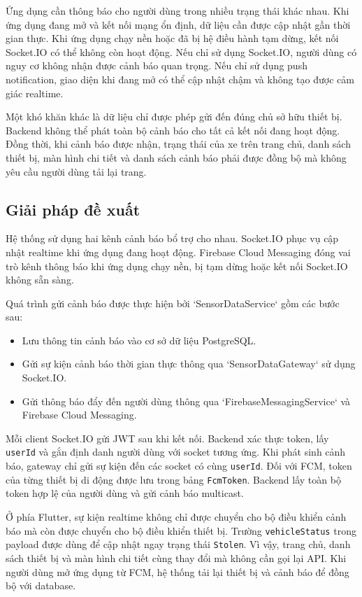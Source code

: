 \documentclass[../DoAn.tex]{subfiles}
\begin{document}
Ứng dụng cần thông báo cho người dùng trong nhiều trạng thái khác nhau. Khi ứng
dụng đang mở và kết nối mạng ổn định, dữ liệu cần được cập nhật gần thời gian
thực. Khi ứng dụng chạy nền hoặc đã bị hệ điều hành tạm dừng, kết nối Socket.IO
có thể không còn hoạt động. Nếu chỉ sử dụng Socket.IO, người dùng có nguy cơ
không nhận được cảnh báo quan trọng. Nếu chỉ sử dụng push notification, giao
diện khi đang mở có thể cập nhật chậm và không tạo được cảm giác realtime.

Một khó khăn khác là dữ liệu chỉ được phép gửi đến đúng chủ sở hữu thiết bị.
Backend không thể phát toàn bộ cảnh báo cho tất cả kết nối đang hoạt động. Đồng
thời, khi cảnh báo được nhận, trạng thái của xe trên trang chủ, danh sách thiết
bị, màn hình chi tiết và danh sách cảnh báo phải được đồng bộ mà không yêu cầu
người dùng tải lại trang.

\subsection{Giải pháp đề xuất}

Hệ thống sử dụng hai kênh cảnh báo bổ trợ cho nhau. Socket.IO phục vụ cập nhật
realtime khi ứng dụng đang hoạt động. Firebase Cloud Messaging đóng vai trò
kênh thông báo khi ứng dụng chạy nền, bị tạm dừng hoặc kết nối Socket.IO không
sẵn sàng.

Quá trình gửi cảnh báo được thực hiện bởi `SensorDataService` gồm các bước sau:

\begin{itemize}
\item Lưu thông tin cảnh báo vào cơ sở dữ liệu PostgreSQL.
\item Gửi sự kiện cảnh báo thời gian thực thông qua `SensorDataGateway` sử dụng Socket.IO.
\item Gửi thông báo đẩy đến người dùng thông qua `FirebaseMessagingService` và Firebase Cloud Messaging.
\end{itemize}

Mỗi client Socket.IO gửi JWT sau khi kết nối. Backend xác thực token, lấy
\texttt{userId} và gắn định danh người dùng với socket tương ứng. Khi phát sinh
cảnh báo, gateway chỉ gửi sự kiện đến các socket có cùng \texttt{userId}. Đối
với FCM, token của từng thiết bị di động được lưu trong bảng
\texttt{FcmToken}. Backend lấy toàn bộ token hợp lệ của người dùng và gửi cảnh
báo multicast.

Ở phía Flutter, sự kiện realtime không chỉ được chuyển cho bộ điều khiển cảnh
báo mà còn được chuyển cho bộ điều khiển thiết bị. Trường
\texttt{vehicleStatus} trong payload được dùng để cập nhật ngay trạng thái
\texttt{Stolen}. Vì vậy, trang chủ, danh sách thiết bị và màn hình chi tiết cùng
thay đổi mà không cần gọi lại API. Khi người dùng mở ứng dụng từ FCM, hệ thống
tải lại thiết bị và cảnh báo để đồng bộ với database.
\end{document}
